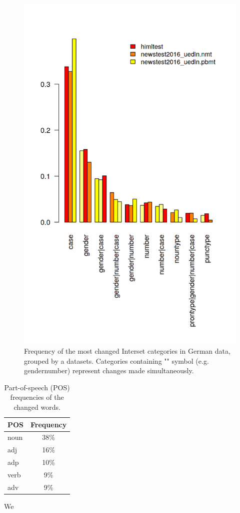 \begin{figure}
\centering
  \includegraphics[scale=0.7]{iset_de}
  \caption{
    Frequency of the most changed Interset categories in German data, grouped by a datasets. Categories containing
    "\textbar" symbol (e.g. gender\textbar{}number) represent changes made simultaneously.
}
  \label{iset_de-barplot}
\end{figure}

\begin{table}[t]
\centering
\small

\begin{tabular}{lc}
POS  &  Frequency  \\
\hline
noun    &   38\%  \\
adj     &   16\%  \\
adp     &   10\%  \\
verb    &   9\%  \\
adv     &   9\%  \\
\end{tabular}
\caption{
    Part-of-speech (POS) frequencies of the changed words.
}
\label{changes_de-pos}
\end{table}


We


